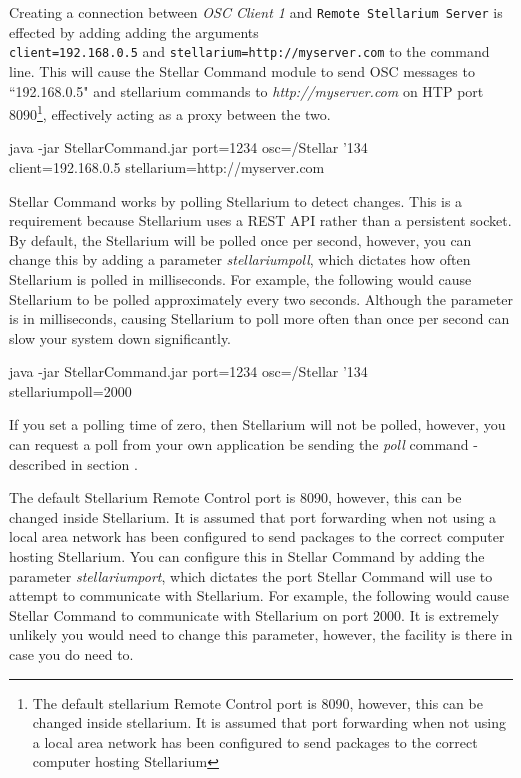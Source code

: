 Creating a connection between \textit{OSC Client 1} and \texttt{Remote Stellarium Server} is effected by adding adding the arguments \\\texttt{client=192.168.0.5} and \texttt{stellarium=http://myserver.com} to the command line.
This will cause the Stellar Command module to send OSC messages to ``192.168.0.5" and stellarium commands to \textit{http://myserver.com} on HTP port 8090\footnote{The default stellarium Remote Control port is 8090, however, this can be changed inside stellarium. It is assumed that port forwarding when not using a local area network has been configured to send packages to the correct computer hosting Stellarium}, effectively acting as a proxy between the two.

 \begin{syntax} 
	\medskip
	java -jar StellarCommand.jar port=1234 osc=/Stellar  {\char'134}\\client=192.168.0.5 stellarium=http://myserver.com\\
	\medskip
\end{syntax}
\bigskip

 
Stellar Command works by polling Stellarium to detect changes. This is a requirement because Stellarium uses a REST API rather than a persistent socket. By default, the Stellarium will be polled once per second, however, you can change this by adding a parameter \textit{stellariumpoll}, which dictates how often Stellarium is polled in milliseconds. For example, the following would cause Stellarium to be polled approximately  every two seconds. Although the parameter is in milliseconds, causing Stellarium to poll more often than once per second can slow your system down significantly. 

 \begin{syntax} 
	\medskip
	java -jar StellarCommand.jar port=1234 osc=/Stellar  {\char'134}\\stellariumpoll=2000 
	\medskip
\end{syntax}
\bigskip
If you set a polling time of zero, then Stellarium will not be polled, however, you can request a poll from your own application be sending the \textit{poll} command - described in section .


The default Stellarium Remote Control port is 8090, however, this can be changed inside Stellarium. It is assumed that port forwarding when not using a local area network has been configured to send packages to the correct computer hosting Stellarium. You can configure this in Stellar Command by adding the parameter \textit{stellariumport}, which dictates the port Stellar Command will use to attempt to communicate with Stellarium. For example, the following would cause Stellar Command to communicate with Stellarium on port 2000. It is extremely unlikely you would need to change this parameter, however, the facility is there in case you do need to.   

